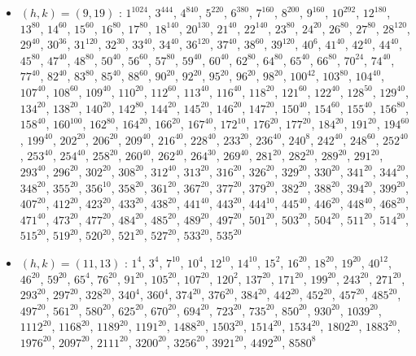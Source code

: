 \begin{itemize}
\item $(h,k)=(9,19)$ : $1^{1024}$, $3^{444}$, $4^{840}$, $5^{220}$, $6^{380}$, $7^{160}$, $8^{200}$, $9^{160}$, $10^{292}$, $12^{180}$, $13^{80}$, $14^{60}$, $15^{60}$, $16^{80}$, $17^{80}$, $18^{140}$, $20^{130}$, $21^{40}$, $22^{140}$, $23^{80}$, $24^{20}$, $26^{80}$, $27^{80}$, $28^{120}$, $29^{40}$, $30^{36}$, $31^{120}$, $32^{30}$, $33^{40}$, $34^{40}$, $36^{120}$, $37^{40}$, $38^{60}$, $39^{120}$, $40^{6}$, $41^{40}$, $42^{40}$, $44^{40}$, $45^{80}$, $47^{40}$, $48^{80}$, $50^{40}$, $56^{60}$, $57^{80}$, $59^{40}$, $60^{40}$, $62^{80}$, $64^{80}$, $65^{40}$, $66^{80}$, $70^{24}$, $74^{40}$, $77^{40}$, $82^{40}$, $83^{80}$, $85^{40}$, $88^{60}$, $90^{20}$, $92^{20}$, $95^{20}$, $96^{20}$, $98^{20}$, $100^{42}$, $103^{80}$, $104^{40}$, $107^{40}$, $108^{60}$, $109^{40}$, $110^{20}$, $112^{60}$, $113^{40}$, $116^{40}$, $118^{20}$, $121^{60}$, $122^{40}$, $128^{50}$, $129^{40}$, $134^{20}$, $138^{20}$, $140^{20}$, $142^{80}$, $144^{20}$, $145^{20}$, $146^{20}$, $147^{20}$, $150^{40}$, $154^{60}$, $155^{40}$, $156^{80}$, $158^{40}$, $160^{100}$, $162^{80}$, $164^{20}$, $166^{20}$, $167^{40}$, $172^{10}$, $176^{20}$, $177^{20}$, $184^{20}$, $191^{20}$, $194^{60}$, $199^{40}$, $202^{20}$, $206^{20}$, $209^{40}$, $216^{40}$, $228^{40}$, $233^{20}$, $236^{40}$, $240^{8}$, $242^{40}$, $248^{60}$, $252^{40}$, $253^{40}$, $254^{40}$, $258^{20}$, $260^{40}$, $262^{40}$, $264^{30}$, $269^{40}$, $281^{20}$, $282^{20}$, $289^{20}$, $291^{20}$, $293^{40}$, $296^{20}$, $302^{20}$, $308^{20}$, $312^{40}$, $313^{20}$, $316^{20}$, $326^{20}$, $329^{20}$, $330^{20}$, $341^{20}$, $344^{20}$, $348^{20}$, $355^{20}$, $356^{10}$, $358^{20}$, $361^{20}$, $367^{20}$, $377^{20}$, $379^{20}$, $382^{20}$, $388^{20}$, $394^{20}$, $399^{20}$, $407^{20}$, $412^{20}$, $423^{20}$, $433^{20}$, $438^{20}$, $441^{40}$, $443^{20}$, $444^{10}$, $445^{40}$, $446^{20}$, $448^{40}$, $468^{20}$, $471^{40}$, $473^{20}$, $477^{20}$, $484^{20}$, $485^{20}$, $489^{20}$, $497^{20}$, $501^{20}$, $503^{20}$, $504^{20}$, $511^{20}$, $514^{20}$, $515^{20}$, $519^{20}$, $520^{20}$, $521^{20}$, $527^{20}$, $533^{20}$, $535^{20}$
\item $(h,k)=(11,13)$ : $1^{4}$, $3^{4}$, $7^{10}$, $10^{4}$, $12^{10}$, $14^{10}$, $15^{2}$, $16^{20}$, $18^{20}$, $19^{20}$, $40^{12}$, $46^{20}$, $59^{20}$, $65^{4}$, $76^{20}$, $91^{20}$, $105^{20}$, $107^{20}$, $120^{2}$, $137^{20}$, $171^{20}$, $199^{20}$, $243^{20}$, $271^{20}$, $293^{20}$, $297^{20}$, $328^{20}$, $340^{4}$, $360^{4}$, $374^{20}$, $376^{20}$, $384^{20}$, $442^{20}$, $452^{20}$, $457^{20}$, $485^{20}$, $497^{20}$, $561^{20}$, $580^{20}$, $625^{20}$, $670^{20}$, $694^{20}$, $723^{20}$, $735^{20}$, $850^{20}$, $930^{20}$, $1039^{20}$, $1112^{20}$, $1168^{20}$, $1189^{20}$, $1191^{20}$, $1488^{20}$, $1503^{20}$, $1514^{20}$, $1534^{20}$, $1802^{20}$, $1883^{20}$, $1976^{20}$, $2097^{20}$, $2111^{20}$, $3200^{20}$, $3256^{20}$, $3921^{20}$, $4492^{20}$, $8580^{8}$

\end{itemize}
